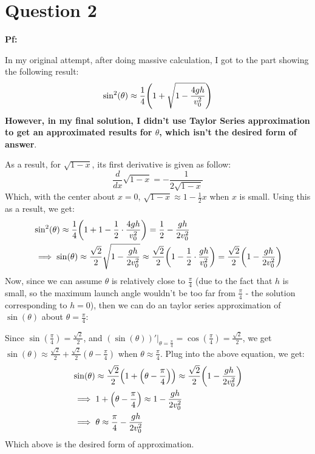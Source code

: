 \documentclass{article}
\DeclarePairedDelimiter{\paran}{(}{)}%
\begin{document}
\break

\section*{Question 2}


\textbf{Pf:}

In my original attempt, after doing massive calculation, I got to the part showing the following result:
\begin{equation}
    \sin^2(\theta)\approx \frac{1}{4}\paran*{1+\sqrt{1-\frac{4gh}{v_0^2}}}
\end{equation}
\textbf{However, in my final solution, I didn't use Taylor Series approximation to get an approximated results for $\theta$, which isn't the desired form of answer}.

As a result, for $\sqrt{1-x}$, its first derivative is given as follow:
\begin{equation}
    \frac{d}{dx}\sqrt{1-x}=-\frac{1}{2\sqrt{1-x}}
\end{equation}
Which, with the center about $x=0$, $\sqrt{1-x}\approx 1-\frac{1}{2}x$ when $x$ is small. Using this as a result, we get:
\begin{align}
    &\sin^2(\theta)\approx \frac{1}{4}\paran*{1+1-\frac{1}{2}\cdot \frac{4gh}{v_0^2}} = \frac{1}{2}-\frac{gh}{2v_0^2}\\
    &\implies \sin(\theta)\approx \frac{\sqrt{2}}{2}\sqrt{1-\frac{gh}{2v_0^2}}\approx \frac{\sqrt{2}}{2}\paran*{1-\frac{1}{2}\cdot\frac{gh}{v_0^2}} = \frac{\sqrt{2}}{2}\paran*{1-\frac{gh}{2v_0^2}}
\end{align}
Now, since we can assume $\theta$ is relatively close to $\frac{\pi}{4}$ (due to the fact that $h$ is small, so the maximum launch angle wouldn't be too far from $\frac{\pi}{4}$ - the solution corresponding to $h=0$), then we can do an taylor series approximation of $\sin(\theta)$ about $\theta = \frac{\pi}{4}$:

Since $\sin(\frac{\pi}{4})=\frac{\sqrt{2}}{2}$, and $(\sin(\theta))'\bigg|_{\theta=\frac{\pi}{4}} = \cos(\frac{\pi}{4})=\frac{\sqrt{2}}{2}$, we get $\sin(\theta)\approx \frac{\sqrt{2}}{2}+\frac{\sqrt{2}}{2}(\theta-\frac{\pi}{4})$ when $\theta\approx \frac{\pi}{4}$. Plug into the above equation, we get:
\begin{align}
    &\sin(\theta)\approx \frac{\sqrt{2}}{2}\paran*{1+\paran*{\theta-\frac{\pi}{4}}} \approx \frac{\sqrt{2}}{2}\paran*{1-\frac{gh}{2v_0^2}}\\
    &\implies 1+\paran*{\theta-\frac{\pi}{4}}\approx 1-\frac{gh}{2v_0^2}\\
    &\implies \theta\approx \frac{\pi}{4}-\frac{gh}{2v_0^2}
\end{align}
Which above is the desired form of approximation.
\end{document}
